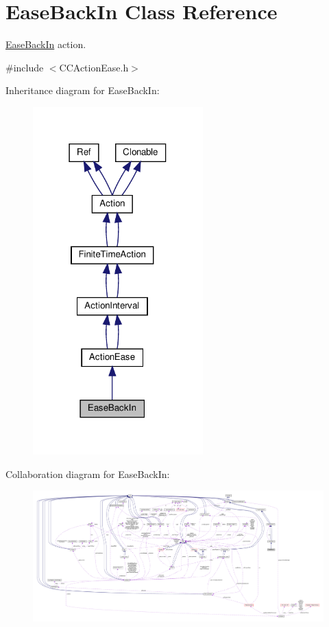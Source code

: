 \hypertarget{classEaseBackIn}{}\section{Ease\+Back\+In Class Reference}
\label{classEaseBackIn}


\hyperlink{classEaseBackIn}{Ease\+Back\+In} action.  




{\ttfamily \#include $<$C\+C\+Action\+Ease.\+h$>$}



Inheritance diagram for Ease\+Back\+In\+:
\nopagebreak
\begin{figure}[H]
\begin{center}
\leavevmode
\includegraphics[width=186pt]{classEaseBackIn__inherit__graph}
\end{center}
\end{figure}


Collaboration diagram for Ease\+Back\+In\+:
\nopagebreak
\begin{figure}[H]
\begin{center}
\leavevmode
\includegraphics[width=350pt]{classEaseBackIn__coll__graph}
\end{center}
\end{figure}
